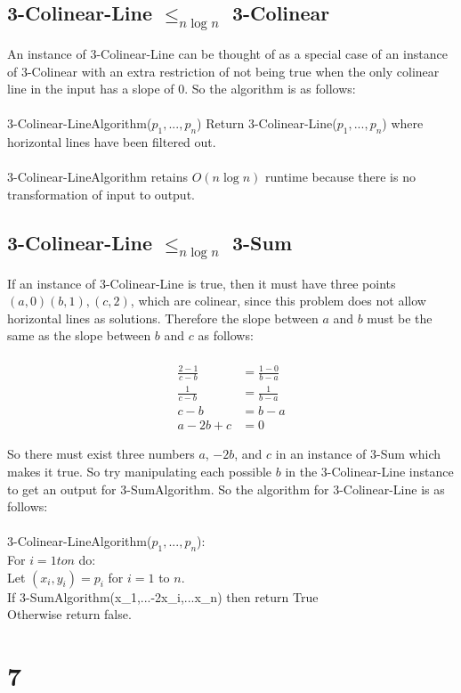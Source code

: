 \documentclass[letterpaper,notitlepage,twoside]{article}
\newcommand\tab[1][1cm]{\hspace*{#1}} %
\begin{document}
\subsection*{3-Colinear-Line $\leq_{n \log n}$  3-Colinear}
An instance of 3-Colinear-Line can be thought of as a special case of an instance of 3-Colinear with an extra restriction of not being true when the only colinear line in the input has a slope of 0. So the algorithm is as follows:
\\\\
3-Colinear-LineAlgorithm($p_1,...,p_n$)
\tab Return 3-Colinear-Line($p_1,...,p_n$) where horizontal lines have been filtered out.
\\\\
3-Colinear-LineAlgorithm retains $O(n \log n)$ runtime because there is no transformation of input to output.

\subsection{3-Colinear-Line $\leq_{n \log n}$ 3-Sum}
If an instance of 3-Colinear-Line is true, then it must have three points $(a, 0) (b, 1), (c, 2)$, which are colinear, since this problem does not allow horizontal lines as solutions. Therefore the slope between $a$ and $b$ must be the same as the slope between $b$ and $c$ as follows:
\\\\
\begin{align*}
\frac{2 - 1}{c - b} &= \frac{1 - 0}{b - a}\\
\frac{1}{c - b} &= \frac{1}{b - a}\\
c - b &= b - a\\
a - 2b + c &= 0
\end{align*}

So there must exist three numbers $a$, $-2b$, and $c$ in an instance of 3-Sum which makes it true. So try manipulating each possible $b$ in the 3-Colinear-Line instance to get an output for 3-SumAlgorithm. So the algorithm for 3-Colinear-Line is as follows:
\\\\
3-Colinear-LineAlgorithm($p_1,...,p_n$):\\
\tab For $i = 1 to n$ do:\\
\tab\tab Let $(x_i, y_i) = p_i$ for $i = 1$ to $n$.\\
\tab\tab If 3-SumAlgorithm(x_1,...-2x_i,...x_n) then return True\\
\tab Otherwise return false.

\section*{7}
\end{document}
